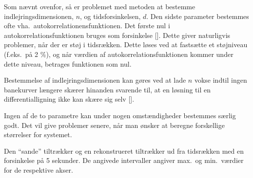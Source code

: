 \vspace{4.0mm}
Som n{\ae}vnt ovenfor, s{\aa} er problemet med metoden at
bestemme indlejringsdimensionen, $n$, og tidsforsinkelsen,
$d$. Den sidste parameter bestemmes ofte vha.\
autokorrelationensfunktionen. Det f{\o}rste nul i
autokorrelationsfunktionen bruges som forsinkelse
[]. Dette giver naturligvis problemer,
n{\aa}r der er st{\o}j i tidsr{\ae}kken. Dette l{\o}ses ved
at fasts{\ae}tte et st{\o}jniveau (f.eks.\ p{\aa} 2 \%), og
n{\aa}r v{\ae}rdien af autokorrelationsfunktionen kommer
under dette niveau, betrages funktionen som nul.

\vspace{4.0mm}
Bestemmelse af indlejringsdimensionen kan g{\o}res ved at
lade $n$ vokse indtil ingen banekurver l{\ae}ngere
sk{\ae}rer hinanden svarende til, at en l{\o}sning til en
differentialligning ikke kan sk{\ae}re sig selv
[].

\vspace{4.0mm}
Ingen af de to parametre kan under nogen omst{\ae}ndigheder
bestemmes s{\ae}rlig godt. Det vil give problemer senere,
n{\aa}r man {\o}nsker at beregne forskellige st{\o}rrelser
for systemet.

{
\caption{\protect\capsize
Den ``sande'' tiltr{\ae}kker og en rekonstrueret
tiltr{\ae}kker ud fra tidsr{\ae}kken med en forsinkelse
p{\aa} 5 sekunder. De angivede intervaller angiver max.\ og 
min.\ v{\ae}rdier for de respektive akser.}
\label{tid:Oregon}
}

